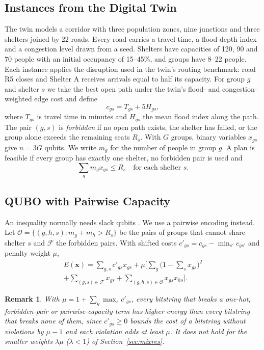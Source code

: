 \documentclass[conference]{IEEEtran}
\newtheorem{remark}{Remark}
\begin{document}
\subsection{Instances from the Digital Twin}
The twin models a corridor with three population zones, nine junctions and three shelters joined by 22 roads. Every road carries a travel time, a flood-depth index and a congestion level drawn from a seed. Shelters have capacities of 120, 90 and 70 people with an initial occupancy of 15--45\%, and groups have 8--22 people. Each instance applies the disruption used in the twin's routing benchmark: road R5 closes and Shelter A receives arrivals equal to half its capacity. For group $g$ and shelter $s$ we take the best open path under the twin's flood- and congestion-weighted edge cost and define
\begin{equation}
c_{gs}=T_{gs}+5H_{gs},
\end{equation}
where $T_{gs}$ is travel time in minutes and $H_{gs}$ the mean flood index along the path. The pair $(g,s)$ is \emph{forbidden} if no open path exists, the shelter has failed, or the group alone exceeds the remaining seats $R_s$. With $G$ groups, binary variables $x_{gs}$ give $n=3G$ qubits. We write $m_g$ for the number of people in group $g$. A plan is feasible if every group has exactly one shelter, no forbidden pair is used and
\begin{equation}
\textstyle\sum_g m_g x_{gs}\le R_s\quad\text{for each shelter } s.
\end{equation}

\subsection{QUBO with Pairwise Capacity}
An inequality normally needs slack qubits \cite{Glover2019}. We use a pairwise encoding instead. Let $\mathcal{O}=\{(g,h,s): m_g+m_h>R_s\}$ be the pairs of groups that cannot share shelter $s$ and $\mathcal{F}$ the forbidden pairs. With shifted costs $c'_{gs}=c_{gs}-\min_{s'}c_{gs'}$ and penalty weight $\mu$,
\begin{multline}
E(\mathbf{x})=\sum_{g,s}c'_{gs}x_{gs}+\mu\Big[\sum_g\Big(1-\sum_s x_{gs}\Big)^2\\
+\sum_{(g,s)\in\mathcal{F}}x_{gs}+\sum_{(g,h,s)\in\mathcal{O}}x_{gs}x_{hs}\Big].
\label{eq:qubo}
\end{multline}

\begin{remark}
With $\mu=1+\sum_g\max_s c'_{gs}$, every bitstring that breaks a one-hot, forbidden-pair or pairwise-capacity term has higher energy than every bitstring that breaks none of them, since $c'_{gs}\ge0$ bounds the cost of a bitstring without violations by $\mu-1$ and each violation adds at least $\mu$. It does not hold for the smaller weights $\lambda\mu$ ($\lambda<1$) of Section~\ref{sec:mixres}.
\end{remark}
\end{document}
